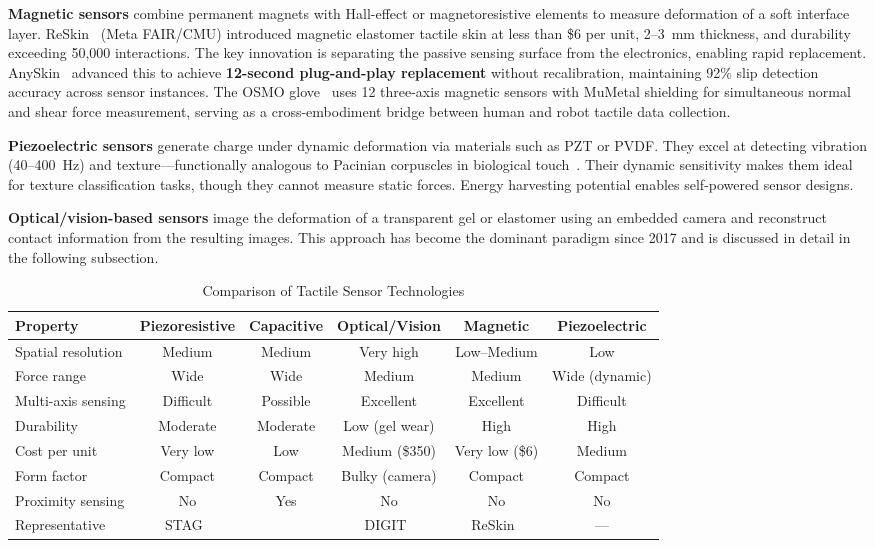 \textbf{Magnetic sensors} combine permanent magnets with Hall-effect or magnetoresistive elements to measure deformation of a soft interface layer. ReSkin~\cite{bhirangi2021reskin} (Meta FAIR/CMU) introduced magnetic elastomer tactile skin at less than \$6 per unit, 2--3~mm thickness, and durability exceeding 50{,}000 interactions. The key innovation is separating the passive sensing surface from the electronics, enabling rapid replacement. AnySkin~\cite{bhirangi2024anyskin} advanced this to achieve \textbf{12-second plug-and-play replacement} without recalibration, maintaining 92\% slip detection accuracy across sensor instances. The OSMO glove~\cite{yin2025osmo} uses 12 three-axis magnetic sensors with MuMetal shielding for simultaneous normal and shear force measurement, serving as a cross-embodiment bridge between human and robot tactile data collection.

\textbf{Piezoelectric sensors} generate charge under dynamic deformation via materials such as PZT or PVDF. They excel at detecting vibration (40--400~Hz) and texture---functionally analogous to Pacinian corpuscles in biological touch~\cite{yu2025texture}. Their dynamic sensitivity makes them ideal for texture classification tasks, though they cannot measure static forces. Energy harvesting potential enables self-powered sensor designs.

\textbf{Optical/vision-based sensors} image the deformation of a transparent gel or elastomer using an embedded camera and reconstruct contact information from the resulting images. This approach has become the dominant paradigm since 2017 and is discussed in detail in the following subsection.

\begin{table}[t]
\caption{Comparison of Tactile Sensor Technologies}
\label{tab:sensors}
\centering
\begin{tabular}{@{}lccccc@{}}
\toprule
\textbf{Property} & \textbf{Piezoresistive} & \textbf{Capacitive} & \textbf{Optical/Vision} & \textbf{Magnetic} & \textbf{Piezoelectric} \\
\midrule
Spatial resolution & Medium & Medium & Very high & Low--Medium & Low \\
Force range & Wide & Wide & Medium & Medium & Wide (dynamic) \\
Multi-axis sensing & Difficult & Possible & Excellent & Excellent & Difficult \\
Durability & Moderate & Moderate & Low (gel wear) & High & High \\
Cost per unit & Very low & Low & Medium (\$350) & Very low (\$6) & Medium \\
Form factor & Compact & Compact & Bulky (camera) & Compact & Compact \\
Proximity sensing & No & Yes & No & No & No \\
Representative & STAG~\cite{sundaram2019stag} & \cite{murphy2025capacitive} & DIGIT~\cite{lambeta2020digit} & ReSkin~\cite{bhirangi2021reskin} & --- \\
\bottomrule
\end{tabular}
\end{table}

